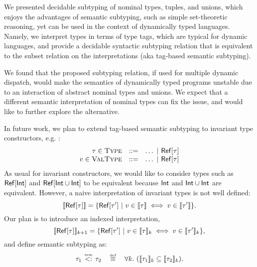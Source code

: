 We presented decidable subtyping of nominal types, tuples, and unions, 
which enjoys the advantages of semantic subtyping, 
such as simple set-theoretic reasoning, 
yet can be used in the context of dynamically typed languages.
Namely, we interpret types in terms of type tags, 
which are typical for dynamic languages,
and provide a decidable syntactic subtyping relation that is
equivalent to the subset relation on the interpretations
(aka tag-based semantic subtyping).

We found that the proposed subtyping relation, 
if used for multiple dynamic dispatch, 
would make the semantics of dynamically typed programs unstable
due to an interaction of abstract nominal types and unions.
We expect that a different semantic interpretation of nominal types 
can fix the issue, and would like to further explore the alternative.

In future work, we plan to extend tag-based semantic subtyping 
to invariant type constructors, e.g. :
\[
\begin{array}{rcl}
\tau \in \textsc{Type}   &::=& \ldots ~\vert~ \mathsf{Ref}[\tau]\\
v \in \textsc{ValType} &::=& \ldots ~\vert~ \mathsf{Ref}[\tau]
\end{array}
\]
As usual for invariant constructors, 
we would like to consider types such as $\mathsf{Ref}[\mathsf{Int}]$
and $\mathsf{Ref}[\mathsf{Int} \cup \mathsf{Int}]$ to be equivalent
because $\mathsf{Int}$ and $\mathsf{Int} \cup \mathsf{Int}$ are equivalent.
However, a naive interpretation of invariant types is not well defined:
\[
\llbracket \mathsf{Ref}[\tau] \rrbracket = 
\{ \mathsf{Ref}[\tau'] ~\vert~ v \in \llbracket \tau \rrbracket \iff v \in \llbracket \tau' \rrbracket \}.
\]
Our plan is to introduce an indexed interpretation,
\[
\llbracket \mathsf{Ref}[\tau] \rrbracket_{k+1} = \{ \mathsf{Ref}[\tau'] 
    ~\vert~ v \in \llbracket \tau \rrbracket_k \iff v \in \llbracket \tau' \rrbracket_k \},
\]
and define semantic subtyping as:
\[
\bjtruesemsub{\ty_1}{\ty_2} \quad \defsign \quad
\forall k.\ (\interpty{\ty_1}_k \subseteq \interpty{\ty_2}_k).
\]


